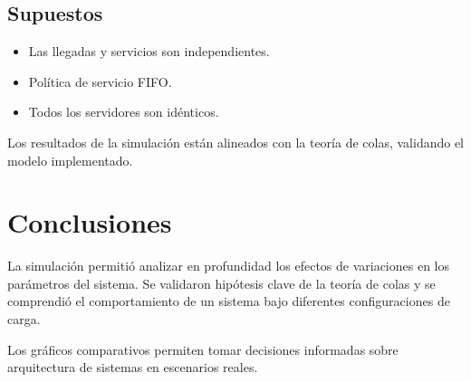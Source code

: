 \documentclass[a4paper,12pt]{article}
\begin{document}
\subsection*{Supuestos}

\begin{itemize}
    \item Las llegadas y servicios son independientes.
    \item Política de servicio FIFO.
    \item Todos los servidores son idénticos.
\end{itemize}

Los resultados de la simulación están alineados con la teoría de colas, validando el modelo implementado.

\section{Conclusiones}

La simulación permitió analizar en profundidad los efectos de variaciones en los parámetros del sistema. Se validaron hipótesis clave de la teoría de colas y se comprendió el comportamiento de un sistema bajo diferentes configuraciones de carga.

Los gráficos comparativos permiten tomar decisiones informadas sobre arquitectura de sistemas en escenarios reales.
\end{document}
